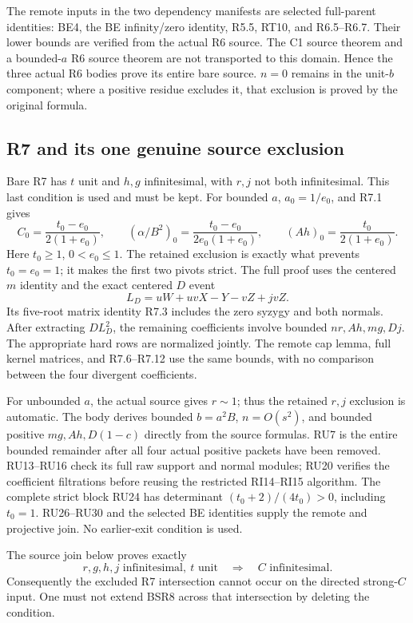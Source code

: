 The remote inputs in the two dependency manifests are
selected full-parent identities: BE4, the BE infinity/zero
identity, R5.5, RT10, and R6.5--R6.7.
Their lower bounds are verified from the actual R6 source.
The C1 source theorem and a bounded-\(a\) R6 source
theorem are not transported to this domain.
Hence the three actual R6 bodies prove its entire bare
source.  \(n=0\) remains in the unit-\(b\) component;
where a positive residue excludes it, that exclusion is
proved by the original formula.

\subsection{R7 and its one genuine source exclusion}

Bare R7 has \(t\) unit and \(h,g\) infinitesimal, with
\(r,j\) not both infinitesimal.  This last condition
is used and must be kept.
For bounded \(a\), \(a_0=1/e_0\), and R7.1 gives
\[
 C_0=\frac{t_0-e_0}{2(1+e_0)},\qquad
 (\alpha/B^2)_0=\frac{t_0-e_0}{2e_0(1+e_0)},\qquad
 (Ah)_0=\frac{t_0}{2(1+e_0)}.
 \tag{BSR8}
\]
Here \(t_0\geq1\), \(0<e_0\leq1\).
The retained exclusion is exactly what prevents
\(t_0=e_0=1\); it makes the first two pivots strict.
The full proof 
uses the centered \(m\) identity and the exact
centered \(D\) event
\[
 L_D=uW+uvX-Y-vZ+jvZ .
 \tag{BSR9}
\]
Its five-root matrix identity R7.3 includes the zero
syzygy and both normals.  After extracting \(DL_D^2\),
the remaining coefficients involve bounded \(nr,Ah,mg,Dj\).
The appropriate hard rows are normalized jointly.
The remote cap lemma, full kernel matrices, and
R7.6--R7.12 use the same bounds, with no comparison
between the four divergent coefficients.

For unbounded \(a\), the actual source gives \(r\sim1\);
thus the retained \(r,j\) exclusion is automatic.
The body  derives bounded
\(b=a^2B\), \(n=O(s^2)\), and bounded positive
\(mg,Ah,D(1-c)\) directly from the source formulas.
RU7 is the entire bounded remainder after all four
actual positive packets have been removed.
RU13--RU16 check its full raw support and normal modules;
RU20 verifies the coefficient filtrations before reusing
the restricted RI14--RI15 algorithm.
The complete strict block RU24 has determinant
\((t_0+2)/(4t_0)>0\), including \(t_0=1\).
RU26--RU30 and the selected BE identities supply the
remote and projective join.  No earlier-exit condition
is used.

The source join below proves exactly
\[
 r,g,h,j\text{ infinitesimal},\ t\text{ unit}
 \quad\Longrightarrow\quad C\text{ infinitesimal}.
 \tag{BSR10}
\]
Consequently the excluded R7 intersection cannot occur
on the directed strong-\(C\) input.  One must not extend
BSR8 across that intersection by deleting the condition.

